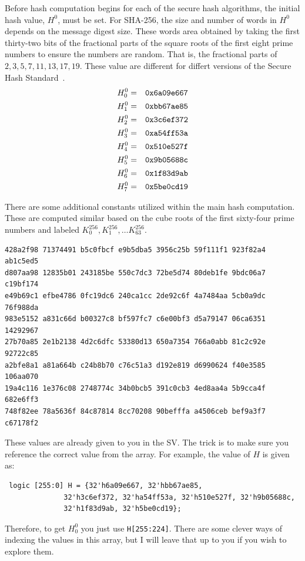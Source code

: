 \documentclass{article}
\begin{document}
Before hash computation begins for each of the secure hash algorithms,
the initial hash value,
$H^0$, must be set. For SHA-256, the size and number of words in $H^0$
depends on the message digest size.  These words area obtained by
taking the first thirty-two bits of the fractional parts of the square
roots of the first eight prime numbers to ensure the numbers are
random.  That is, the fractional parts of $2, 3, 5, 7, 11, 13, 17,
19$.  These value are different for differt versions of the Secure
Hash Standard~\cite{1250396}.
\begin{eqnarray*}
  H_0^0 & = & \verb!0x6a09e667!\\
  H_1^0 & = & \verb!0xbb67ae85!\\
  H_2^0 & = & \verb!0x3c6ef372!\\
  H_3^0 & = & \verb!0xa54ff53a!\\
  H_4^0 & = & \verb!0x510e527f!\\
  H_5^0 & = & \verb!0x9b05688c!\\
  H_6^0 & = & \verb!0x1f83d9ab!\\
  H_7^0 & = & \verb!0x5be0cd19!\\
\end{eqnarray*}

There are some additional constants utilized within the main hash
computation.  These are computed similar based on the cube roots of
the first sixty-four prime numbers and labeled
$K_0^{256}, K_1^{256}, \ldots K_{63}^{256}$.
\begin{verbatim}
428a2f98 71374491 b5c0fbcf e9b5dba5 3956c25b 59f111f1 923f82a4 ab1c5ed5
d807aa98 12835b01 243185be 550c7dc3 72be5d74 80deb1fe 9bdc06a7 c19bf174
e49b69c1 efbe4786 0fc19dc6 240ca1cc 2de92c6f 4a7484aa 5cb0a9dc 76f988da
983e5152 a831c66d b00327c8 bf597fc7 c6e00bf3 d5a79147 06ca6351 14292967
27b70a85 2e1b2138 4d2c6dfc 53380d13 650a7354 766a0abb 81c2c92e 92722c85
a2bfe8a1 a81a664b c24b8b70 c76c51a3 d192e819 d6990624 f40e3585 106aa070
19a4c116 1e376c08 2748774c 34b0bcb5 391c0cb3 4ed8aa4a 5b9cca4f 682e6ff3
748f82ee 78a5636f 84c87814 8cc70208 90befffa a4506ceb bef9a3f7 c67178f2
\end{verbatim}

These values are already given to you in the SV.  The trick is to make
sure you reference the correct value from the array.  For example, the
value of $H$ is given as:
\begin{verbatim}
 logic [255:0] H = {32'h6a09e667, 32'hbb67ae85,
		      32'h3c6ef372, 32'ha54ff53a, 32'h510e527f, 32'h9b05688c,
		      32'h1f83d9ab, 32'h5be0cd19};
\end{verbatim}
Therefore, to get $H_0^0$ you just use \verb!H[255:224]!.  There are
some clever ways of indexing the values in this array, but I will
leave that up to you if you wish to explore them.
\end{document}
